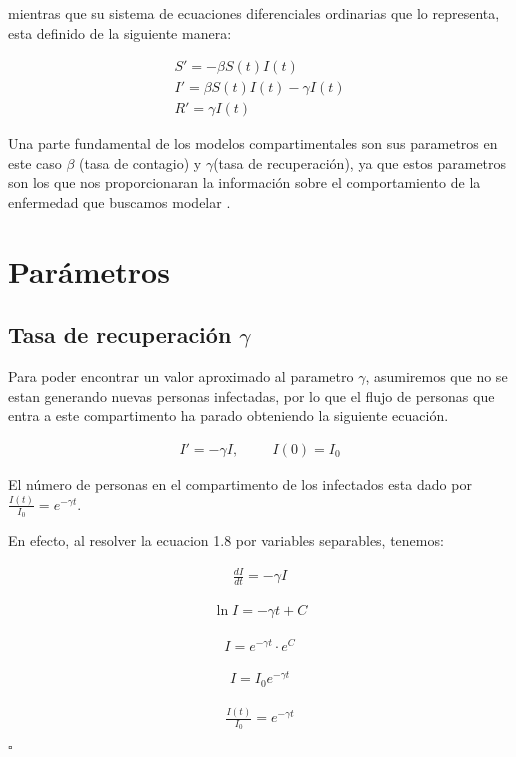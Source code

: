 mientras que su sistema de ecuaciones diferenciales ordinarias que lo representa, esta definido de la siguiente manera:

\begin{align}
S' = -\beta S\left(t\right)I\left(t\right)\\			
I' = \beta S\left(t\right)I\left(t\right) - \gamma I\left(t\right)\\		
R' = \gamma I\left(t\right)
\end{align}

Una parte fundamental de los modelos compartimentales son sus parametros en este caso $\beta$ (tasa de contagio) y $\gamma$(tasa de recuperación), ya que estos parametros son los que nos proporcionaran la información sobre el comportamiento de la enfermedad que buscamos modelar \cite{Martcheva}.


\section{\textbf{Parámetros}}
\subsection{Tasa de recuperación \textbf{$\gamma$}}

Para poder encontrar un valor aproximado al parametro $\gamma$, asumiremos que no se estan generando nuevas personas infectadas, por lo que el flujo de personas que entra a este compartimento ha parado obteniendo la siguiente ecuación.

\begin{align}
I' = -\gamma I, \hspace{1cm} I(0) = I_{0}
\end{align}

\begin{Af}
El número de personas en el compartimento de los infectados esta dado por $\frac{I(t)}{I_{0}} = e^{-\gamma t}$.
\end{Af}

\begin{Dem}
En efecto, al resolver la ecuacion 1.8 por variables separables, tenemos: 

\begin{align*}
\frac{dI}{dt} = - \gamma I
\end{align*}

\begin{align*}
\ln{I} = - \gamma t + C
\end{align*}

\begin{align*}
I = e^{- \gamma t} \cdot e^{C}
\end{align*}

\begin{align*}
I = I_{0} e^{- \gamma t}
\end{align*}

\begin{align*}
\frac{I(t)}{I_{0}} = e^{-\gamma t}
\end{align*}

\hfill	$\square$

\end{Dem}

